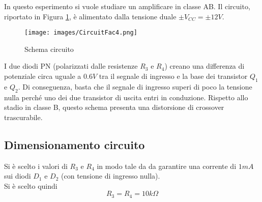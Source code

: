 In questo esperimento si vuole studiare un amplificare in classe AB. Il circuito, riportato in Figura \ref{fig:CircuitFac4}, è alimentato dalla tensione duale $\pm V_{CC}=\pm 12V$.
\begin{figure}[H]
    \centering
    \texttt{[image: images/CircuitFac4.png]}
    \caption{Schema circuito}
    \label{fig:CircuitFac4}
\end{figure}
I due diodi PN (polarizzati dalle resistenze $R_3$ e $R_4$) creano una differenza di potenziale circa uguale a $0.6 V$ tra il segnale di ingresso e la base dei transistor $Q_1$ e $Q_2$. Di conseguenza, basta che il segnale di ingresso superi di poco la tensione nulla perché uno dei due transistor di uscita entri in conduzione. Rispetto allo stadio in classe B, questo schema presenta una distorsione di crossover trascurabile.
\subsection{Dimensionamento circuito}
Si è scelto i valori di $R_3$ e $R_4$ in modo tale da da garantire una corrente di $1 mA$ sui diodi $D_1$ e $D_2$ (con tensione di ingresso nulla).\\
Si è scelto quindi
\begin{equation*}
    R_3=R_4=10k\Omega
\end{equation*}
